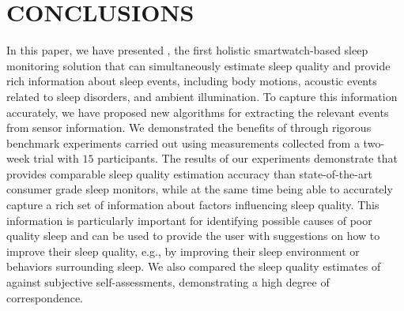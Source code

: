 \section{CONCLUSIONS}
In this paper, we have presented {\systemname}, the first holistic smartwatch-based sleep monitoring solution that can simultaneously
estimate sleep quality and provide rich information about sleep events, including body motions, acoustic events related to sleep disorders,
and ambient illumination. To capture this information accurately, we have proposed new algorithms for extracting the relevant events from
sensor information. We demonstrated the benefits of {\systemname} through rigorous benchmark experiments carried out using measurements
collected from a two-week trial with $15$ participants. The results of our experiments demonstrate that {\systemname} provides comparable
sleep quality estimation accuracy than state-of-the-art consumer grade sleep monitors, while at the same time being able to accurately
capture a rich set of information about factors influencing sleep quality. This information is particularly important for identifying
possible causes of poor quality sleep and can be used to provide the user with suggestions on how to improve their sleep quality, e.g., by
improving their sleep environment or behaviors surrounding sleep. We also compared the sleep quality estimates of {\systemname} against
subjective self-assessments, demonstrating a high degree of correspondence.
